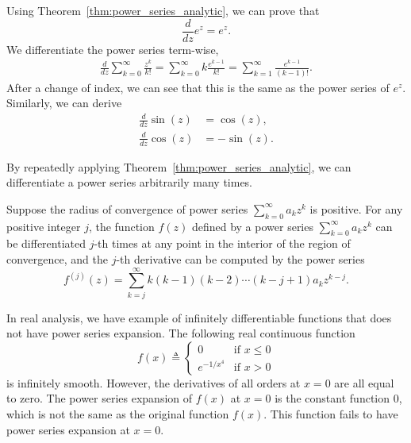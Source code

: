 Using Theorem~\ref{thm:power_series_analytic}, we can prove that 
$$\frac{d}{dz} e^{z} = e^{z}.$$
We differentiate the power series term-wise,
\begin{align*}
	\frac{d}{dz} \sum_{k=0}^\infty \frac{z^k}{k!} =
	\sum_{k=0}^\infty k \frac{e^{k-1}}{k!} = \sum_{k=1}^\infty \frac{e^{k-1}}{(k-1)!}.
\end{align*}
After a change of index, we can see that this is the same as the power series of $e^{z}$.
Similarly, we can derive
\begin{align*}
	\frac{d}{dz} \sin(z) &= \cos(z),  \\
	\frac{d}{dz} \cos(z) &= -\sin(z).
\end{align*}





By repeatedly applying Theorem~\ref{thm:power_series_analytic}, we can differentiate a power series arbitrarily many times.

\begin{svgraybox}
	\begin{theorem} Suppose the radius of convergence of power series
		$\sum_{k=0}^\infty a_k z^k$ is positive. 	
		For any positive integer $j$, the function $f(z)$ defined by a power series $\sum_{k=0}^\infty a_k z^k$ can be differentiated $j$-th times at any point in the interior of the region of convergence, and the $j$-th derivative can be computed by the power series
		$$
		f^{(j)}(z) = \sum_{k=j}^\infty k(k-1)(k-2)\cdots(k-j+1) a_k z^{k-j}.
		$$
	\end{theorem}
\end{svgraybox}




In real analysis, we have example of infinitely differentiable functions that does not have power series expansion. The following real continuous function
$$
f(x) \triangleq \begin{cases}
	0 & \text{if } x \leq 0 \\
	e^{-1/x^4} & \text{if } x > 0
\end{cases}
$$
is infinitely smooth. However, the derivatives of all orders at $x=0$ are all equal to zero. The power series expansion of $f(x)$ at $x=0$ is the constant function 0, which is not the same as the original function $f(x)$. This function fails to have power series expansion at $x=0$.

